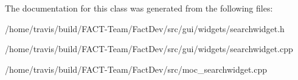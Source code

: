 The documentation for this class was generated from the following files\-:\begin{DoxyCompactItemize}
\item 
/home/travis/build/\-F\-A\-C\-T-\/\-Team/\-Fact\-Dev/src/gui/widgets/searchwidget.\-h\item 
/home/travis/build/\-F\-A\-C\-T-\/\-Team/\-Fact\-Dev/src/gui/widgets/searchwidget.\-cpp\item 
/home/travis/build/\-F\-A\-C\-T-\/\-Team/\-Fact\-Dev/src/moc\-\_\-searchwidget.\-cpp\end{DoxyCompactItemize}
